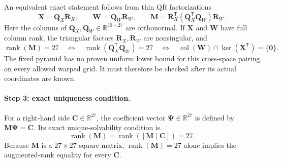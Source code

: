 \documentclass[11pt,a4paper]{article}
\begin{document}
An equivalent exact statement follows from thin QR factorizations
\begin{equation}
 \bm X=\bm Q_X\bm R_X,\qquad
 \bm W=\bm Q_W\bm R_W,\qquad
 \bm M=\bm R_X^{\mathsf T}
       (\bm Q_X^{\mathsf T}\bm Q_W)\bm R_W.
\label{eq:cross-subspace-factorisation}
\end{equation}
Here the columns of $\bm Q_X,\bm Q_W\in\mathbb R^{30\times27}$ are orthonormal. If
$\bm X$ and $\bm W$ have full column rank, the triangular factors $\bm R_X,\bm R_W$ are
nonsingular, and
\begin{equation}
 \operatorname{rank}(\bm M)=27
 \quad\Longleftrightarrow\quad
 \operatorname{rank}(\bm Q_X^{\mathsf T}\bm Q_W)=27
 \quad\Longleftrightarrow\quad
 \operatorname{col}(\bm W)\cap\ker(\bm X^{\mathsf T})=\{\bm0\}.
\label{eq:cross-pairing-condition}
\end{equation}
The fixed pyramid has no proven uniform lower bound for this cross-space pairing on every
allowed warped grid. It must therefore be checked after its actual coordinates are known.

\paragraph{Step 3: exact uniqueness condition.}
For a right-hand side $\bm C\in\mathbb R^{27}$, the coefficient vector
$\bm\Psi\in\mathbb R^{27}$ is defined by $\bm M\bm\Psi=\bm C$. Its exact
unique-solvability condition is
\begin{equation}
 \operatorname{rank}(\bm M)
 =\operatorname{rank}([\bm M\mid\bm C])=27.
\label{eq:unique-solvability}
\end{equation}
Because $\bm M$ is a $27\times27$ square matrix, $\operatorname{rank}(\bm M)=27$ alone
implies the augmented-rank equality for every $\bm C$.

\end{document}
